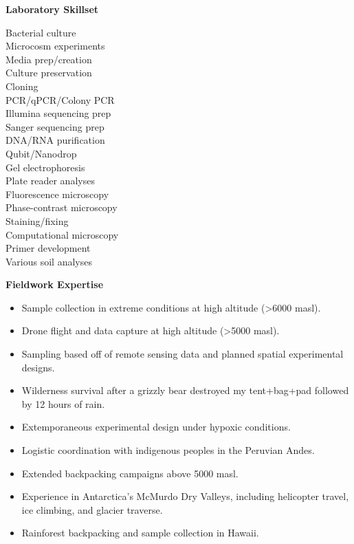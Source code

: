 \documentclass{article}
\begin{document}
\vspace{3mm}
{\large  \textbf{Laboratory Skillset}}
  \begin{adjustwidth}{2mm}{}\begin{multicols}{3}
    Bacterial culture\\
    Microcosm experiments\\
    Media prep/creation\\
    Culture preservation\\
    Cloning\\
    PCR/qPCR/Colony PCR\\
    Illumina sequencing prep\\
    Sanger sequencing prep\\
    DNA/RNA purification\\
    Qubit/Nanodrop\\
    Gel electrophoresis\\
    Plate reader analyses\\
    Fluorescence microscopy\\
    Phase-contrast microscopy\\
    Staining/fixing\\
    Computational microscopy\\
    Primer development\\
    Various soil analyses
  \end{multicols}\end{adjustwidth}

\vspace{3mm}
{\large  \textbf{Fieldwork Expertise}}
\begin{itemize}[noitemsep,topsep=0pt, leftmargin=5mm]
  \item Sample collection in extreme conditions at high altitude (\textgreater6000 masl).
  \item Drone flight and data capture at high altitude (\textgreater5000 masl).
  \item Sampling based off of remote sensing data and planned spatial experimental designs.
  \item Wilderness survival after a grizzly bear destroyed my tent+bag+pad followed by 12 hours of rain.
  \item Extemporaneous experimental design under hypoxic conditions.
  \item Logistic coordination with indigenous peoples in the Peruvian Andes.
  \item Extended backpacking campaigns above 5000 masl.
  \item Experience in Antarctica’s McMurdo Dry Valleys, including helicopter travel, ice climbing, and glacier traverse.
  \item Rainforest backpacking and sample collection in Hawaii.

\end{itemize}
\end{document}
